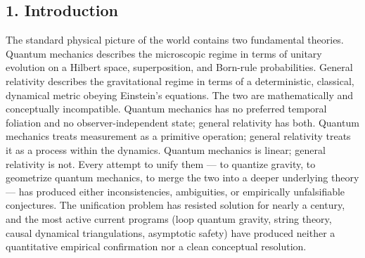 \documentclass[
]{article}
\begin{document}
\hypertarget{introduction}{%
\subsection{1. Introduction}\label{introduction}}

The standard physical picture of the world contains two fundamental
theories. Quantum mechanics describes the microscopic regime in terms of
unitary evolution on a Hilbert space, superposition, and Born-rule
probabilities. General relativity describes the gravitational regime in
terms of a deterministic, classical, dynamical metric obeying Einstein's
equations. The two are mathematically and conceptually incompatible.
Quantum mechanics has no preferred temporal foliation and no
observer-independent state; general relativity has both. Quantum
mechanics treats measurement as a primitive operation; general
relativity treats it as a process within the dynamics. Quantum mechanics
is linear; general relativity is not. Every attempt to unify them --- to
quantize gravity, to geometrize quantum mechanics, to merge the two into
a deeper underlying theory --- has produced either inconsistencies,
ambiguities, or empirically unfalsifiable conjectures. The unification
problem has resisted solution for nearly a century, and the most active
current programs (loop quantum gravity, string theory, causal dynamical
triangulations, asymptotic safety) have produced neither a quantitative
empirical confirmation nor a clean conceptual resolution.
\end{document}
